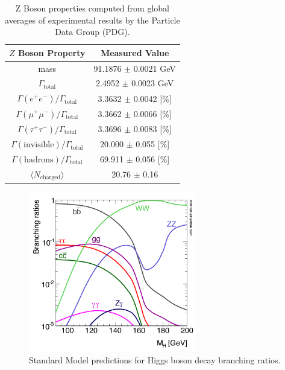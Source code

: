 \begin{table}[!htb]
\begin{center}
\begin{tabular}{|c|c|}
\hline
$Z$ Boson Property & Measured Value \\ \hline
mass & 91.1876 $\pm$ 0.0021 GeV \\
\hline
$\Gamma_{\mathrm{total}}$ & 2.4952 $\pm$ 0.0023 GeV \\
$\Gamma(e^+ e^-) / \Gamma_{\mathrm{total}}$ & 3.3632 $\pm$ 0.0042 [\%]\\
$\Gamma(\mu^+ \mu^-) / \Gamma_{\mathrm{total}}$ & 3.3662 $\pm$ 0.0066 [\%]\\
$\Gamma(\tau^+ \tau^-) / \Gamma_{\mathrm{total}}$ & 3.3696 $\pm$ 0.0083 [\%]\\
$\Gamma(\mathrm{invisible}) / \Gamma_{\mathrm{total}}$ & 20.000 $\pm$ 0.055 [\%]\\
$\Gamma(\mathrm{hadrons}) / \Gamma_{\mathrm{total}}$ & 69.911 $\pm$ 0.056 [\%]\\
\hline
$\langle N_{\mathrm{charged}} \rangle$ & 20.76 $\pm$ 0.16 \\
\hline
\end{tabular}
\caption{
Z Boson properties computed from global averages of experimental results by the Particle Data Group (PDG). \cite{PDG:PhysRevD.98.030001}
}
\label{tab:z_props}
\end{center}
\end{table}

\begin{figure}
	\centering
	\includegraphics[width=0.65\textwidth,origin=c]{h_branching_ratios}
	\caption{
	Standard Model predictions for Higgs boson decay branching ratios. \cite{Dittmaier:2012vm}
	}
	\label{fig:h_branching_ratios}
\end{figure}

